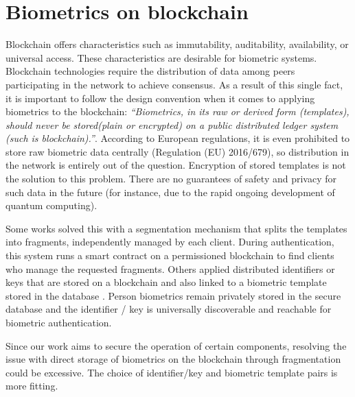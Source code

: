 \section{Biometrics on blockchain}
\label{Biometrics on blockchain}
Blockchain offers characteristics such as immutability, auditability, availability, or universal access. These characteristics are desirable for biometric systems. Blockchain technologies require the distribution of data among peers participating in the network to achieve consensus. As a result of this single fact, it is important to follow the design convention when it comes to applying biometrics to the blockchain: \emph{``Biometrics, in its raw or derived form (templates), should never be stored(plain or encrypted) on a public distributed ledger system (such is blockchain).''}\cite{BiometricsOnBlockchain}. According to European regulations, it is even prohibited to store raw biometric data centrally (Regulation (EU) 2016/679\cite{EuropeanParliamentRegulation}), so distribution in the network is entirely out of the question. Encryption of stored templates is not the solution to this problem. There are no guarantees of safety and privacy for such data in the future (for instance, due to the rapid ongoing development of quantum computing).

Some works solved this with a segmentation mechanism that splits the templates into fragments, independently managed by each client. During authentication, this system runs a smart contract on a permissioned blockchain to find clients who manage the requested fragments\cite{SecuringBiometricAuthenticationBlockchain}. Others applied distributed identifiers or keys that are stored on a blockchain and also linked to a biometric template stored in the database \cite{BiometricsOnBlockchain}. Person biometrics remain privately stored in the secure database and the identifier / key is universally discoverable and reachable for biometric authentication. 

Since our work aims to secure the operation of certain components, resolving the issue with direct storage of biometrics on the blockchain through fragmentation could be excessive. The choice of identifier/key and biometric template pairs is more fitting. 


